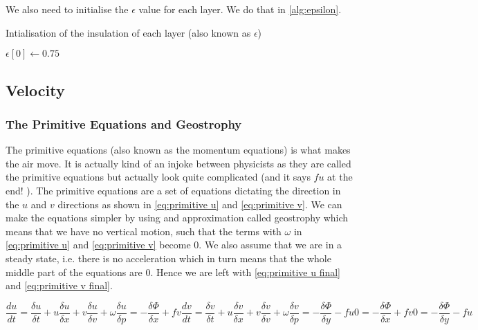 We also need to initialise the $\epsilon$ value for each layer. We do that in \autoref{alg:epsilon}.

\begin{algorithm}
    \caption{Intialisation of the insulation of each layer (also known as $\epsilon$)}
    \label{alg:epsilon}
    $\epsilon[0] \leftarrow 0.75$ \;
\end{algorithm}

\subsection{Velocity}
\subsubsection{The Primitive Equations and Geostrophy} \label{sec:primitive}
The primitive equations (also known as the momentum equations) is what makes the air move. It is actually kind of an injoke between physicists as they are called the primitive equations but 
actually look quite complicated (and it says $fu$ at the end! \cite{simon}). The primitive equations are a set of equations dictating the direction in the $u$ and $v$ directions as shown in 
\autoref{eq:primitive u} and \autoref{eq:primitive v}. We can make the equations simpler by using and approximation called geostrophy which means that we have no vertical motion, such that the
terms with $\omega$ in \autoref{eq:primitive u} and \autoref{eq:primitive v} become 0. We also assume that we are in a steady state, i.e. there is no acceleration which in turn means that the 
whole middle part of the equations are $0$. Hence we are left with \autoref{eq:primitive u final} and \autoref{eq:primitive v final}.

\begin{subequations}
    \begin{equation}
        \label{eq:primitive u}
        \frac{du}{dt} = \frac{\delta u}{\delta t} + u\frac{\delta u}{ \delta x} + v\frac{\delta u}{\delta v} + \omega\frac{\delta u}{\delta p} = -\frac{\delta \Phi}{\delta x} + fv
    \end{equation}
    \begin{equation}
        \label{eq:primitive v}
        \frac{dv}{dt} = \frac{\delta v}{\delta t} + u\frac{\delta v}{ \delta x} + v\frac{\delta v}{\delta v} + \omega\frac{\delta v}{\delta p} = -\frac{\delta \Phi}{\delta y} - fu
    \end{equation}
    \begin{equation}
        \label{eq:primitive u final}
        0 = -\frac{\delta \Phi}{\delta x} + fv
    \end{equation}
    \begin{equation}
        \label{eq:primitive v final}
        0 = -\frac{\delta \Phi}{\delta y} - fu
    \end{equation}
\end{subequations}


